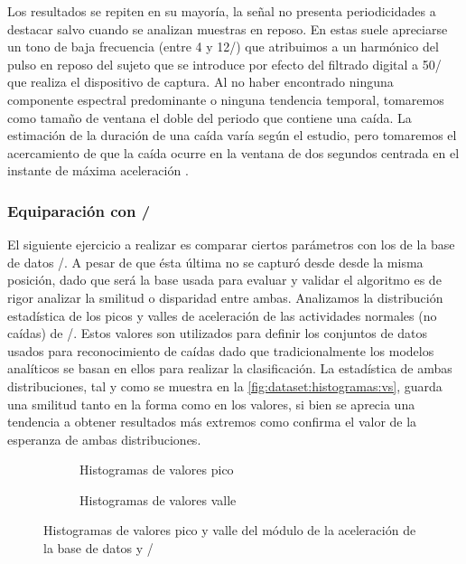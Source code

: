 Los resultados se repiten en su mayoría, la señal no presenta periodicidades a destacar salvo cuando se analizan muestras en reposo. En estas suele apreciarse un tono de baja frecuencia (entre 4 y 12\hz/) que atribuimos a un harmónico del pulso en reposo del sujeto que se introduce por efecto del filtrado digital a 50\hz/ que realiza el dispositivo de captura. Al no haber encontrado ninguna componente espectral predominante o ninguna tendencia temporal, tomaremos como tamaño de ventana el doble del periodo que contiene una caída. La estimación de la duración de una caída varía según el estudio, pero tomaremos el acercamiento de que la caída ocurre en la ventana de dos segundos centrada en el instante de máxima aceleración \cite{Sucerquia2017}. 

\subsubsection{Equiparación con \sisfall/}

El siguiente ejercicio a realizar es comparar ciertos parámetros con los de la base de datos \ifell/.  A pesar de que ésta última no se capturó desde desde la misma posición, dado que será la base usada para evaluar y validar el algoritmo es de rigor analizar la smilitud o disparidad entre ambas. Analizamos la distribución estadística de los picos y valles de aceleración de las actividades normales (no caídas) de \sisfall/. Estos valores son utilizados para definir los conjuntos de datos usados para reconocimiento de caídas dado que tradicionalmente los modelos analíticos se basan en ellos para realizar la clasificación. La estadística de ambas distribuciones, tal y como se muestra en la \autoref{fig:dataset:histogramas:vs}, guarda una smilitud tanto en la forma como en los valores, si bien se aprecia una tendencia a obtener resultados más extremos como confirma el valor de la esperanza de ambas distribuciones.

  \begin{figure}[htb!]
    \centering
    \begin{subfigure}[b]{0.45\textwidth}
      \centering
      \caption{\label{fig:dataset:histoUp} Histogramas de valores pico}
    \end{subfigure}
    \hfill
    \begin{subfigure}[b]{0.45\textwidth}
      \centering
      \caption{\label{fig:dataset:histoLow} Histogramas de valores valle}
    \end{subfigure}
    \caption{\label{fig:dataset:histogramas:vs} Histogramas de valores pico y valle del módulo de la aceleración de la base de datos y \sisfall/}
  \end{figure}

